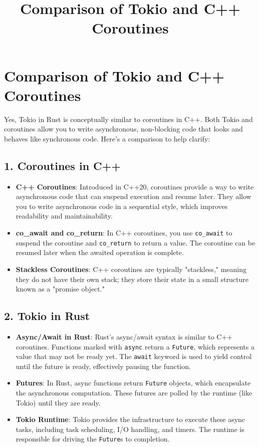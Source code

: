 \documentclass{article}
\title{Comparison of Tokio and C++ Coroutines}
\author{}
\date{}
\begin{document}
\maketitle

\section{Comparison of Tokio and C++ Coroutines}

Yes, Tokio in Rust is conceptually similar to coroutines in C++. Both Tokio and coroutines allow you to write asynchronous, non-blocking code that looks and behaves like synchronous code. Here's a comparison to help clarify:

\subsection{1. Coroutines in C++}
\begin{itemize}
    \item \textbf{C++ Coroutines}: Introduced in C++20, coroutines provide a way to write asynchronous code that can suspend execution and resume later. They allow you to write asynchronous code in a sequential style, which improves readability and maintainability.
    \item \textbf{co\_await and co\_return}: In C++ coroutines, you use \texttt{co\_await} to suspend the coroutine and \texttt{co\_return} to return a value. The coroutine can be resumed later when the awaited operation is complete.
    \item \textbf{Stackless Coroutines}: C++ coroutines are typically "stackless," meaning they do not have their own stack; they store their state in a small structure known as a "promise object."
\end{itemize}

\subsection{2. Tokio in Rust}
\begin{itemize}
    \item \textbf{Async/Await in Rust}: Rust's async/await syntax is similar to C++ coroutines. Functions marked with \texttt{async} return a \texttt{Future}, which represents a value that may not be ready yet. The \texttt{await} keyword is used to yield control until the future is ready, effectively pausing the function.
    \item \textbf{Futures}: In Rust, async functions return \texttt{Future} objects, which encapsulate the asynchronous computation. These futures are polled by the runtime (like Tokio) until they are ready.
    \item \textbf{Tokio Runtime}: Tokio provides the infrastructure to execute these async tasks, including task scheduling, I/O handling, and timers. The runtime is responsible for driving the \texttt{Future}s to completion.
\end{itemize}
\end{document}
